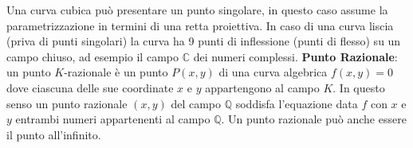 \documentclass[a4paper,12pt]{tesiinfo}
\begin{document}
\newline
Una curva cubica pu\`o presentare un punto singolare, in questo caso assume la parametrizzazione in termini di una retta proiettiva. In caso di una curva liscia (priva di punti singolari) la curva ha 9 punti di inflessione (punti di flesso) su un campo chiuso, ad esempio il campo $\mathbb{C}$ dei numeri complessi. 
\newline\newline
%
%
%
\textbf{Punto Razionale}: un punto $K$-razionale \`e un punto $P(x, y)$ di una curva algebrica $f(x, y)=0$ dove ciascuna delle sue coordinate $x$ e $y$ appartengono al campo $K$. In questo senso un punto razionale $(x, y)$ del campo $\mathbb{Q}$ soddisfa l'equazione data $f$ con $x$ e $y$ entrambi numeri appartenenti al campo $\mathbb{Q}$. 
\newline
Un punto razionale pu\`o anche essere il punto all'infinito.
\newline\newline
%
%
%
\newline\newline
%
%
%
%
%
%
%
%
%
%
%
%
%
\end{document}
